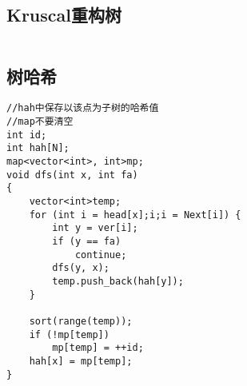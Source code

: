 \documentclass[twocolumn,a4]{article}
\begin{document}
\subsection{Kruscal重构树}
\begin{lstlisting}

\end{lstlisting}

\subsection{树哈希}
\begin{lstlisting}
//hah中保存以该点为子树的哈希值
//map不要清空
int id;
int hah[N];
map<vector<int>, int>mp;
void dfs(int x, int fa)
{
    vector<int>temp;
    for (int i = head[x];i;i = Next[i]) {
        int y = ver[i];
        if (y == fa)
            continue;
        dfs(y, x);
        temp.push_back(hah[y]);
    }

    sort(range(temp));
    if (!mp[temp])
        mp[temp] = ++id;
    hah[x] = mp[temp];
}

\end{lstlisting}
\end{document}
